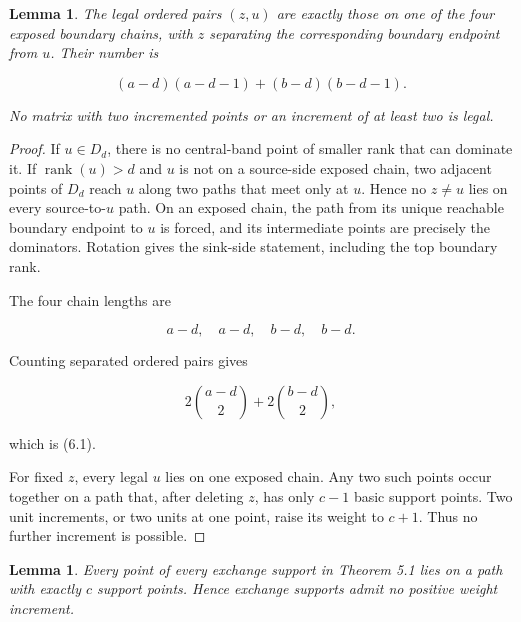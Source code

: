 \documentclass[11pt]{article}
\newtheorem{lemma}[theorem]{Lemma}
\numberwithin{equation}{section}
\begin{document}
\Needspace{0.25\textheight}
\begin{lemma}

The legal ordered pairs $(z,u)$ are exactly those on one of the four exposed
boundary chains, with $z$ separating the corresponding boundary endpoint
from $u$. Their number is

\nopagebreak[4]
\[
(a-d)(a-d-1)+(b-d)(b-d-1).
\tag{6.1}
\]

No matrix with two incremented points or an increment of at least two is
legal.

\end{lemma}

\begin{proof}

If $u\in D_d$, there is no central-band point of smaller rank that can
dominate it. If $\operatorname{rank}(u)>d$ and $u$ is not on a source-side
exposed chain, two adjacent points of $D_d$ reach $u$ along two paths that
meet only at $u$. Hence no $z\ne u$ lies on every source-to-$u$ path. On an
exposed chain, the path from its unique reachable boundary endpoint to $u$
is forced, and its intermediate points are precisely the dominators.
Rotation gives the sink-side statement, including the top boundary rank.

The four chain lengths are

\nopagebreak[4]
\[
a-d,\quad a-d,\quad b-d,\quad b-d.
\]

Counting separated ordered pairs gives

\nopagebreak[4]
\[
2\binom{a-d}{2}+2\binom{b-d}{2},
\]

which is (6.1).

For fixed $z$, every legal $u$ lies on one exposed chain. Any two such points
occur together on a path that, after deleting $z$, has only $c-1$ basic
support points. Two unit increments, or two units at one point, raise its
weight to $c+1$. Thus no further increment is possible.
\end{proof}


\Needspace{0.25\textheight}
\begin{lemma}

Every point of every exchange support in Theorem 5.1 lies on a path with
exactly $c$ support points. Hence exchange supports admit no positive weight
increment.

\end{lemma}
\end{document}
